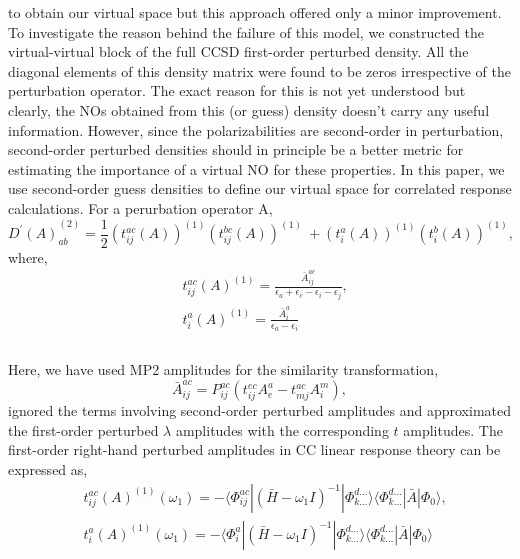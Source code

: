 to obtain our virtual space but this approach offered only a minor improvement\cite{}.
To investigate the reason behind the failure of this model, we constructed the virtual-virtual
block of the full CCSD first-order perturbed density. All the diagonal elements of this density 
matrix were found to be zeros irrespective of the perturbation operator. The exact reason for this
is not yet understood but clearly, the NOs obtained from this (or guess) density doesn't carry any useful
information. However, since the polarizabilities are second-order in perturbation, second-order perturbed densities 
should in principle be a better metric for estimating the importance of a virtual NO for these properties.
In this paper, we use second-order guess densities to define our virtual space for correlated response calculations.
For a perurbation operator A,
\begin{equation}
{D^{'}(A)}^{(2)}_{ab} = \frac{1}{2}(t^{ac}_{ij}(A))^{(1)}(t^{bc}_{ij}(A))^{(1)} \
+ (t^{a}_{i}(A))^{(1)} (t^{b}_{i}(A))^{(1)}, 
\end{equation}
where,
\begin{equation}
\begin{split}
& t^{ac}_{ij}(A)^{(1)} = \frac{\bar{A}^{ac}_{ij}}{\epsilon_a + \epsilon_c - \epsilon_i - \epsilon_j},\\
& t^{a}_{i}(A)^{(1)} = \frac{\bar{A}^{a}_{i}}{\epsilon_a - \epsilon_i}\\
\end{split}
\end{equation}
\\
Here, we have used MP2 amplitudes for the similarity transformation,
\begin{equation}
\bar{A}^{ac}_{ij} = P_{ij}^{ac}(t^{ec}_{ij}A^a_e - t^{ac}_{mj}A^m_i) ,
\end{equation}
ignored the terms involving second-order perturbed amplitudes and 
approximated the first-order perturbed $\lambda$ amplitudes with the 
corresponding $t$ amplitudes. The first-order right-hand perturbed
amplitudes in CC linear response theory can be expressed as, 
\\
\begin{equation}
\begin{split}
& t^{ac}_{ij}(A)^{(1)}(\omega_1) = - \langle\Phi_{ij}^{ac}| {(\bar{H} -\omega_1 I)}^{-1} |
\Phi_{k\ldots}^{d\ldots}\rangle \langle \Phi_{k\ldots}^{d\ldots}| \bar{A} | \Phi_0\rangle, \\
& t^{a}_{i}(A)^{(1)}(\omega_1) = - \langle\Phi_{i}^{a}| {(\bar{H} -\omega_1 I)}^{-1} |
\Phi_{k\ldots}^{d\ldots}\rangle \langle \Phi_{k\ldots}^{d\ldots}| \bar{A} | \Phi_0\rangle \\
\end{split}
\end{equation}
